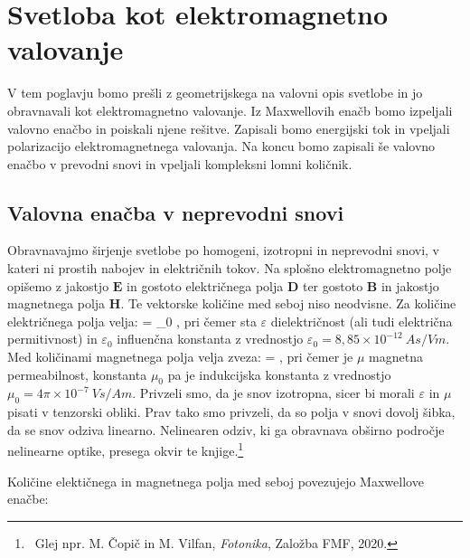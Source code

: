 
\chapter{Svetloba kot elektromagnetno valovanje}
V tem poglavju bomo prešli z geometrijskega  na valovni opis svetlobe in jo 
obravnavali kot elektromagnetno valovanje. Iz Maxwellovih enačb
bomo izpeljali valovno enačbo in poiskali njene rešitve.
Zapisali bomo energijski tok
in vpeljali polarizacijo elektromagnetnega valovanja. Na koncu
bomo zapisali še valovno enačbo v prevodni snovi in vpeljali 
kompleksni lomni količnik. 

\section{Valovna enačba v neprevodni snovi}
Obravnavajmo širjenje svetlobe po homogeni, izotropni in neprevodni snovi, 
v kateri ni prostih nabojev in električnih tokov. Na splošno elektromagnetno polje
opišemo z jakostjo  $\mathbf{E}$ in gostoto električnega polja $\mathbf{D}$
ter gostoto $\mathbf{B}$ in jakostjo magnetnega polja $\mathbf{H}$. Te vektorske
količine med seboj niso neodvisne. Za količine električnega polja velja:
\beq
{} = \varepsilon \varepsilon_0 ,
\label{eq:DE}
\eeq
pri čemer sta $\varepsilon$ dielektričnost (ali tudi električna permitivnost) in $\varepsilon_0$
influenčna konstanta z vrednostjo $\varepsilon_0 = 8,85 \times 10^{-12}~\si{As/Vm}$. 
Med količinami magnetnega polja velja zveza:
\beq
{} = ,
\label{eq:HB}
\eeq
pri čemer je $\mu$ magnetna permeabilnost, konstanta $\mu_0$ pa je 
indukcijska konstanta z vrednostjo $\mu_0 = 4 \pi \times 10^{-7}~\si{Vs/Am}$.
Privzeli smo, da je snov izotropna, sicer bi morali $\varepsilon$ in $\mu$ pisati v 
tenzorski obliki. Prav tako smo privzeli, da so polja v snovi dovolj šibka, da
se snov odziva linearno. Nelinearen odziv, ki ga obravnava obširno področje
nelinearne optike, presega okvir te knjige.\footnote{~Glej npr. M. Čopič in M. Vilfan, 
{\it Fotonika}, Založba FMF, 2020.}

Količine elektičnega in magnetnega polja med seboj povezujejo Maxwellove
enačbe:

